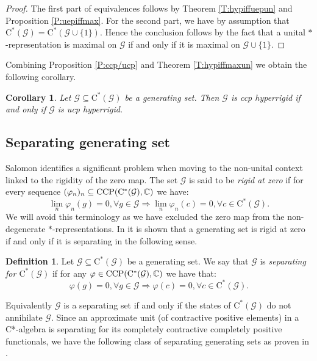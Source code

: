 \documentclass[11pt, draft]{amsart}
\numberwithin{equation}{section}
\theoremstyle{plain}
\newtheorem{corollary}[theorem]{Corollary}
\theoremstyle{definition}
\newtheorem{definition}[theorem]{Definition}
\theoremstyle{remark}
\newcommand{\G}{{\mathcal{G}}}
\newcommand\vphi{\varphi}
\newcommand{\bC}{\mathbb{C}}
\newcommand{\ca}{\mathrm{C}^*}
\begin{document}
\begin{proof}
The first part of equivalences follows by Theorem \ref{T:hypiffuepun} and Proposition \ref{P:uepiffmax}.
For the second part, we have by assumption that $\ca(\G) = \ca(\G \cup \{1\})$.
Hence the conclusion follows by the fact that a unital $*$-representation is maximal on $\G$ if and only if it is maximal on $\G\cup \{1\}$.
\end{proof}

Combining Proposition \ref{P:ccp/ucp} and Theorem \ref{T:hypiffmaxun} we obtain the following corollary.

\begin{corollary}\label{C:ccp/ucp}
Let $\G\subseteq\ca(\G)$ be a generating set.
Then $\G$ is ccp hyperrigid if and only if $\G$ is ucp hyperrigid.
\end{corollary}

\subsection{Separating generating set}

Salomon \cite{Sal17} identifies a significant problem when moving to the non-unital context linked to the rigidity of the zero map.
The set $\G$ is said to be \emph{rigid at zero} if for every sequence $(\vphi_n)_n \subseteq {\rm CCP}(\ca(\G), \bC)$ we have:
\[
\lim_n \vphi_n(g)=0, \forall g \in \G
\Rightarrow
\lim_n \vphi_n(c) = 0, \forall c \in \ca(\G).
\]
We will avoid this terminology as we have excluded the zero map from the non-degenerate $*$-representations.
In \cite[Theorem 3.3]{Sal17} it is shown that a generating set is rigid at zero if and only if it is separating in the following sense.

\begin{definition}
Let $\G \subseteq \ca(\G)$ be a generating set.
We say that $\G$ is \emph{separating for $\ca(\G)$} if for any $\vphi \in {\rm CCP}(\ca(\G), \bC)$ we have that:
\[
\vphi(g) = 0, \forall g \in \G \Rightarrow \vphi(c) = 0, \forall c \in \ca(\G).
\]
\end{definition}

Equivalently $\G$ is a separating set if and only if the states of $\ca(\G)$ do not annihilate $\G$.
Since an approximate unit (of contractive positive elements) in a C*-algebra is separating for its completely contractive completely positive functionals, we have the following class of separating generating sets as proven in \cite[Proposition 3.6]{Sal17}.
\end{document}
